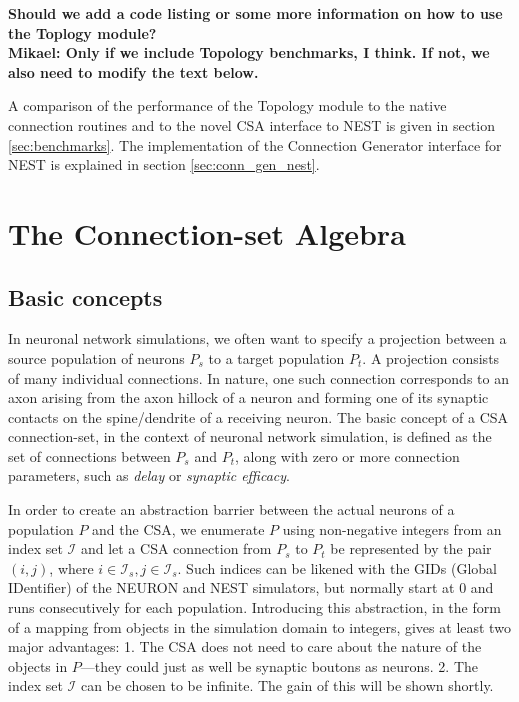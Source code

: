 \documentclass{frontiersSCNS} %
\newcommand{\tbw}[1]{{\bf\parindent0pt\color{red}#1}}
\begin{document}
\tbw{Should we add a code listing or some more information on how to
  use the Toplogy module?\\
Mikael: Only if we include Topology benchmarks, I think. If not, we
also need to modify the text below.}

A comparison of the performance of the Topology module to the native
connection routines and to the novel CSA interface to NEST is given in
section \ref{sec:benchmarks}. The implementation of the Connection
Generator interface for NEST is explained in section
\ref{sec:conn_gen_nest}.


\section{The Connection-set Algebra}\label{sec:csa}

\subsection{Basic concepts}

In neuronal network simulations, we often want to specify a projection
between a source population of neurons $P_s$ to a target population
$P_t$.  A projection consists of many individual connections.  In
nature, one such connection corresponds to an axon arising from the
axon hillock of a neuron and forming one of its synaptic contacts on
the spine/dendrite of a receiving neuron.  The basic concept of a CSA
connection-set, in the context of neuronal network simulation, is
defined as the set of connections between $P_s$ and $P_t$, along with
zero or more connection parameters, such as \emph{delay} or
\emph{synaptic efficacy}.

In order to create an abstraction barrier between the actual neurons
of a population $P$ and the CSA, we enumerate $P$ using non-negative
integers from an index set $\mathcal{I}$ and let a CSA connection from
$P_s$ to $P_t$ be represented by the pair $(i, j)$, where $i \in
\mathcal{I}_s, j \in \mathcal{I}_s$.  Such indices can be likened with
the GIDs (Global IDentifier) of the NEURON and NEST simulators, but
normally start at 0 and runs consecutively for each population.
Introducing this abstraction, in the form of a mapping from objects in
the simulation domain to integers, gives at least two major
advantages: 1. The CSA does not need to care about the nature of the
objects in $P$---they could just as well be synaptic boutons as neurons.
2. The index set $\mathcal{I}$ can be chosen to be infinite.  The
gain of this will be shown shortly.
\end{document}
